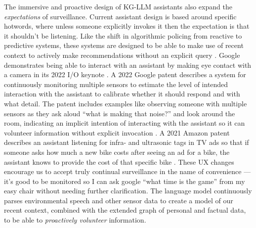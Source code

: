 The immersive and proactive design of KG-LLM assistants also expand the
\emph{expectations} of surveillance. Current assistant design is based
around specific hotwords, where unless someone explicitly invokes it
then the expectation is that it shouldn't be listening. Like the shift
in algorithmic policing from reactive to predictive systems, these
systems are designed to be able to make use of recent context to
actively make recommendations without an explicit query . Google demonstrates being able to
interact with an assistant by making eye contact with a camera in its
2022 I/O keynote \cite{googleGoogleKeynoteGoogle2022} . A 2022
Google patent describes a system for continuously monitoring multiple
sensors to estimate the level of intended interaction with the assistant
to calibrate whether it should respond and with what detail. The patent
includes examples like observing someone with multiple sensors as they
ask aloud ``what is making that noise?'' and look around the room,
indicating an implicit intention of interacting with the assistant so it
can volunteer information without explicit invocation \cite{carbuneAutomatedAssistantAdaptation2022} . A 2021 Amazon patent
describes an assistant listening for infra- and ultrasonic tags in TV
ads so that if someone asks how much a new bike costs after seeing an ad
for a bike, the assistant knows to provide the cost of that specific
bike \cite{mahajanCommunicatingContextDevice2021} . These UX
changes encourage us to accept truly continual surveillance in the name
of convenience --- it's good to be monitored so I can ask google ``what
time is the game'' from my easy chair without needing further
clarification. The language model continuously parses environmental
speech and other sensor data to create a model of our recent context,
combined with the extended graph of personal and factual data, to be
able to \emph{proactively volunteer} information.

